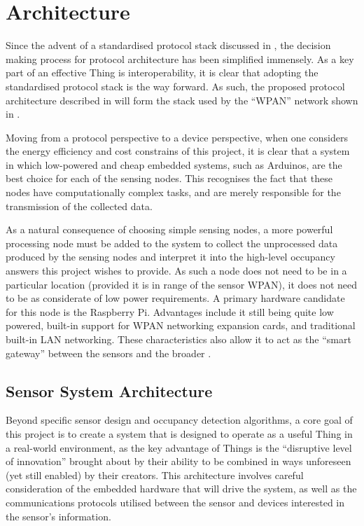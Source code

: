 \documentclass[../thesis/thesis.tex]{subfiles}
\begin{document}
\chapter{Architecture}

Since the advent of a standardised \iot protocol stack discussed in , the decision making process for protocol architecture has been simplified immensely. As a key part of an effective Thing is interoperability, it is clear that adopting the standardised protocol stack is the way forward. As such, the proposed protocol architecture described in  will form the stack used by the ``WPAN'' network shown in .

Moving from a protocol perspective to a device perspective, when one considers the energy efficiency and cost constrains of this project, it is clear that a system in which low-powered and cheap embedded systems, such as Arduinos, are the best choice for each of the sensing nodes. This recognises the fact that these nodes have computationally complex tasks, and are merely responsible for the transmission of the collected data.

As a natural consequence of choosing simple sensing nodes, a more powerful processing node must be added to the system to collect the unprocessed data produced by the sensing nodes and interpret it into the high-level occupancy answers this project wishes to provide. As such a node does not need to be in a particular location (provided it is in range of the sensor WPAN), it does not need to be as considerate of low power requirements. A primary hardware candidate for this node is the Raspberry Pi. Advantages include it still being quite low powered, built-in support for WPAN networking expansion cards, and traditional built-in LAN networking. These characteristics also allow it to act as the ``smart gateway'' between the sensors and the broader \iot.



\section{Sensor System Architecture}
\label{sec:litreview:architecture}
Beyond specific sensor design and occupancy detection algorithms, a core goal of this project is to create a system that is designed to operate as a useful Thing in a real-world \iot environment, as the key advantage of Things is the ``disruptive level of innovation''\cite{atzori2010internet} brought about by their ability to be combined in ways unforeseen (yet still enabled) by their creators. This architecture involves careful consideration of the embedded hardware that will drive the system, as well as the communications protocols utilised between the sensor and devices interested in the sensor's information.
\end{document}
